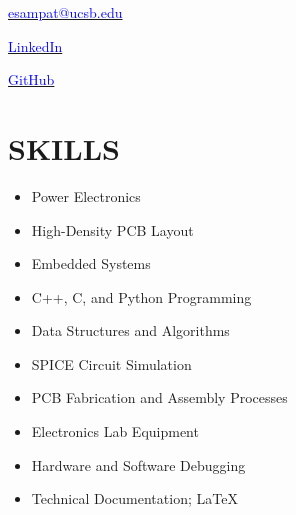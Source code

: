 

	\maketitle
	
	\begin{center}
		\begin{minipage}{0.33\textwidth}
			\centering \href{esampat@ucsb.edu}{\textcolor{blue}{esampat@ucsb.edu}}
		\end{minipage}%
		\begin{minipage}{0.33\textwidth}
			\centering \href{https://www.linkedin.com/in/erk-sampat-500331245/}{\textcolor{blue}{LinkedIn}}
		\end{minipage}%
		\begin{minipage}{0.33\textwidth}
			\centering \href{https://github.com/SAR-mango}{\textcolor{blue}{GitHub}}
		\end{minipage}
	\end{center}
	
	\section*{SKILLS}
	\begin{minipage}{0.5\textwidth}
		\centering
		\begin{itemize}
			\setlength \itemsep{0.1em}
			\item Power Electronics
			\item High-Density PCB Layout
			\item Embedded Systems
			\item C++, C, and Python Programming
			\item Data Structures and Algorithms
		\end{itemize}
	\end{minipage}%
	\begin{minipage}{0.5\textwidth}
		\centering
		\begin{itemize}
			\setlength \itemsep{0.1em}
			\item SPICE Circuit Simulation
			\item PCB Fabrication and Assembly Processes
			\item Electronics Lab Equipment
			\item Hardware and Software Debugging
			\item Technical Documentation; \LaTeX
		\end{itemize}
	\end{minipage}
	
